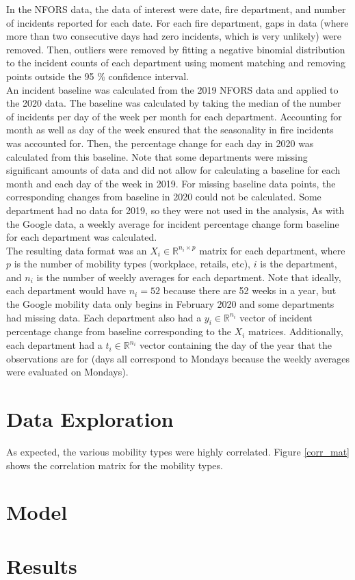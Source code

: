 \documentclass[paper=a4, fontsize=11pt]{scrartcl}
\numberwithin{equation}{section}		%
\numberwithin{figure}{section}			%
\numberwithin{table}{section}				%
\begin{document}
In the NFORS data, the data of interest were date, fire department, and number of incidents reported for each date. For each fire department, gaps in data (where more than two consecutive days had zero incidents, which is very unlikely) were removed. Then, outliers were removed by fitting a negative binomial distribution to the incident counts of each department using moment matching and removing points outside the 95 \% confidence interval.\\


An incident baseline was calculated from the 2019 NFORS data and applied to the 2020 data. The baseline was calculated by taking the median of the number of incidents per day of the week per month for each department. Accounting for month as well as day of the week ensured that the seasonality in fire incidents was accounted for. Then, the percentage change for each day in 2020 was calculated from this baseline. Note that some departments were missing significant amounts of data and did not allow for calculating a baseline for each month and each day of the week in 2019. For missing baseline data points, the corresponding changes from baseline in 2020 could not be calculated.  Some department had no data for 2019, so they were not used in the analysis, As with the Google data, a weekly average for incident percentage change form baseline for each department was calculated. \\

 The resulting data format was an $X_i \in \mathbb{R}^{n_i \times p}$ matrix for each department, where $p$ is the number of mobility types (workplace, retails, etc), $i$ is the department, and $n_i$ is the number of weekly averages for each department. Note that ideally, each department would have $n_i = 52$ because there are 52 weeks in a year, but the Google mobility data only begins in February 2020 and some departments had missing data. Each department also had a $y_i \in \mathbb{R}^{n_i}$ vector of incident percentage change from baseline corresponding to the $X_i$ matrices. Additionally, each department had a $t_i \in \mathbb{R}^{n_i}$ vector containing the day of the year that the observations are for (days all correspond to Mondays because the weekly averages were evaluated on Mondays).


\section{Data Exploration}
As expected, the various mobility types were highly correlated. Figure \ref{corr_mat} shows the correlation matrix for the mobility types.



\section{Model}
\section{Results}





\printbibliography
\end{document}
